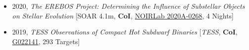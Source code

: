 \documentclass[letterpaper,12pt]{article}
\begin{document}
\begin{itemize}
\item 2020, \textit{The EREBOS Project: Determining the Influence of Substellar Objects on Stellar Evolution} [SOAR 4.1m, \textbf{CoI}, \href{https://legacy.noirlab.edu/noaoprop/abstract.mpl?2020A-0268}{\textcolor{rotundaorange}{NOIRLab 2020A-0268}}, 4 Nights]
\item 2019, \textit{TESS Observations of Compact Hot Subdwarf Binaries} [\textit{TESS}, \textbf{CoI}, \href{https://heasarc.gsfc.nasa.gov/docs/tess/data/approved-programs/cycle2/G022141.txt}{\textcolor{rotundaorange}{G022141}}, 293 Targets]

\end{itemize}
\end{document}
